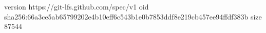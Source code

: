 version https://git-lfs.github.com/spec/v1
oid sha256:66a3ce5ab65799202e4b10eff6c543b1e0b7853ddf8e219cb457ee94ffdf383b
size 87544
